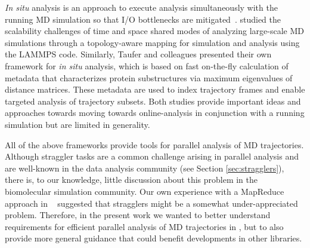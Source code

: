 \textit{In situ} analysis is an approach to execute analysis simultaneously with the running MD simulation so that I/O bottlenecks are  mitigated~\cite{Malakar-etal, Johnston:2017aa}.
\citet{Malakar-etal} studied the scalability challenges of time and space shared modes of analyzing large-scale MD simulations through a topology-aware mapping for simulation and analysis using the LAMMPS code.
Similarly, Taufer and colleagues \cite{Johnston:2017aa} presented their own framework for \textit{in situ} analysis, which is based on fast on-the-fly calculation of metadata that characterizes protein substructures via maximum eigenvalues of distance matrices.
These metadata are used to index trajectory frames and enable targeted analysis of trajectory subsets.
Both studies provide important ideas and approaches towards moving towards online-analysis in conjunction with a running simulation but are limited in generality.

All of the above frameworks provide tools for parallel analysis of MD trajectories. 
Although straggler tasks are a common challenge arising in parallel analysis and are well-known in the data analysis community (see Section \ref{sec:stragglers}), there is, to our knowledge, little discussion about this problem in the biomolecular simulation community.
Our own experience with a MapReduce approach in ~\cite{Khoshlessan:2017ab, Fan:2019aa} suggested that stragglers might be a somewhat under-appreciated problem.
Therefore, in the present work we wanted to better understand requirements for efficient parallel analysis of MD trajectories in , but to also provide more general guidance that could benefit developments in other libraries.




